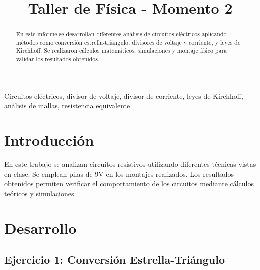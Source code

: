 \documentclass[conference]{IEEEtran}
\begin{document}
\title{Taller de Física - Momento 2}

\author{
    \and
    \and
}

\maketitle

\begin{abstract}
    En este informe se desarrollan diferentes análisis de circuitos eléctricos
    aplicando métodos como conversión estrella-triángulo, divisores de voltaje
    y corriente, y leyes de Kirchhoff. Se realizaron cálculos matemáticos,
    simulaciones y montaje físico para validar los resultados obtenidos.
\end{abstract}

\begin{IEEEkeywords}
    Circuitos eléctricos, divisor de voltaje, divisor de corriente,
    leyes de Kirchhoff, análisis de mallas, resistencia equivalente
\end{IEEEkeywords}

\section{Introducción}
En este trabajo se analizan circuitos resistivos utilizando diferentes técnicas
vistas en clase. Se emplean pilas de 9V en los montajes realizados.
Los resultados obtenidos permiten verificar el comportamiento de los circuitos
mediante cálculos teóricos y simulaciones.

\section{Desarrollo}

\subsection{Ejercicio 1: Conversión Estrella-Triángulo}
\end{document}
